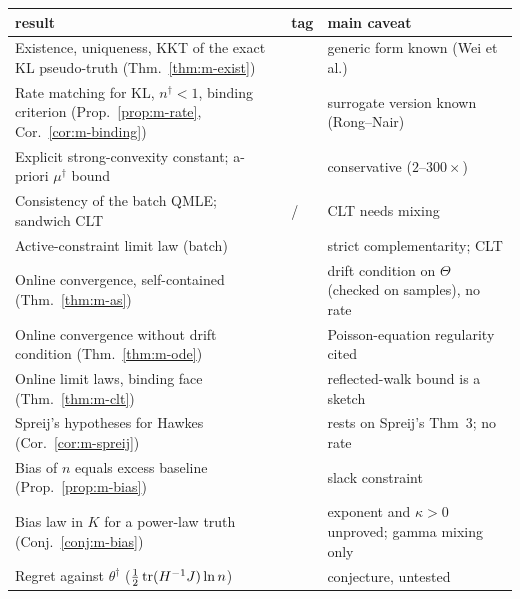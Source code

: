 \begin{center}\small
\begin{tabular}{@{}p{6.1cm}p{1.3cm}p{6.1cm}@{}}\toprule
result & tag & main caveat\\\midrule
Existence, uniqueness, KKT of the exact KL pseudo-truth (Thm.~\ref{thm:m-exist}) & \Pt{} & generic form known (Wei et al.)\\
Rate matching for KL, $n^\dagger<1$, binding criterion (Prop.~\ref{prop:m-rate}, Cor.~\ref{cor:m-binding}) & \Pt{} & surrogate version known (Rong--Nair)\\
Explicit strong-convexity constant; a-priori $\mu^\dagger$ bound & \Pt{} & conservative ($2$--$300\times$)\\
Consistency of the batch QMLE; sandwich CLT & \Pt{}/\Ps{} & CLT needs mixing\\
Active-constraint limit law (batch) & \Ps{} & strict complementarity; CLT\\
Online convergence, self-contained (Thm.~\ref{thm:m-as}) & \Pt{} & drift condition on $\Theta$ (checked on samples), no rate\\
Online convergence without drift condition (Thm.~\ref{thm:m-ode}) & \Ps{} & Poisson-equation regularity cited\\
Online limit laws, binding face (Thm.~\ref{thm:m-clt}) & \Ps{} & reflected-walk bound is a sketch\\
Spreij's hypotheses for Hawkes (Cor.~\ref{cor:m-spreij}) & \Ps{} & rests on Spreij's Thm~3; no rate\\
Bias of $n$ equals excess baseline (Prop.~\ref{prop:m-bias}) & \Pt{} & slack constraint\\
Bias law in $K$ for a power-law truth (Conj.~\ref{conj:m-bias}) & \Nt{} & exponent and $\kappa>0$ unproved; gamma mixing only\\
Regret against $\theta^\dagger$ ($\tfrac12\operatorname{tr}(H^{-1}J)\ln n$) & \Ot{} & conjecture, untested\\\bottomrule
\end{tabular}
\end{center}

